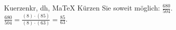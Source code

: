 \begin{MAufgabe}{Kuerzen}{kr, dh, MaTeX}
K\"urzen Sie soweit m\"oglich: $\frac{680}{504}$.\\ 
\ifLsg\MLoesung
\quad $\frac{680}{504}=\frac{(8)\cdot(85)}{(8)\cdot(63)}=\frac{85}{63}$.\else\relax\fi
 \end{MAufgabe}